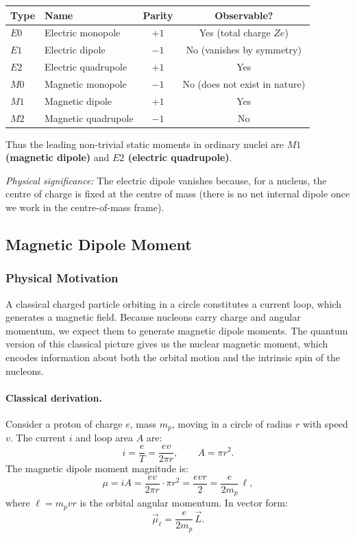 \begin{center}
\begin{tabular}{l l c c}
\toprule
Type & Name & Parity & Observable? \\
\midrule
$E0$ & Electric monopole & $+1$ & Yes (total charge $Ze$) \\
$E1$ & Electric dipole   & $-1$ & No (vanishes by symmetry) \\
$E2$ & Electric quadrupole & $+1$ & Yes \\
$M0$ & Magnetic monopole & $-1$ & No (does not exist in nature) \\
$M1$ & Magnetic dipole   & $+1$ & Yes \\
$M2$ & Magnetic quadrupole & $-1$ & No \\
\bottomrule
\end{tabular}
\end{center}

Thus the leading non-trivial static moments in ordinary nuclei are \textbf{$M1$ (magnetic dipole)} and \textbf{$E2$ (electric quadrupole)}.

\medskip
\textit{Physical significance:} The electric dipole vanishes because, for a nucleus, the centre of charge is fixed at the centre of mass (there is no net internal dipole once we work in the centre-of-mass frame).

\subsection*{Magnetic Dipole Moment}

\subsubsection*{Physical Motivation}
A classical charged particle orbiting in a circle constitutes a current loop, which generates a magnetic field.  Because nucleons carry charge and angular momentum, we expect them to generate magnetic dipole moments.  The quantum version of this classical picture gives us the nuclear magnetic moment, which encodes information about both the orbital motion and the intrinsic spin of the nucleons.

\paragraph{Classical derivation.}
Consider a proton of charge $e$, mass $m_p$, moving in a circle of radius $r$ with speed $v$.  The current $i$ and loop area $A$ are:
\[
  i = \frac{e}{T} = \frac{ev}{2\pi r}, \qquad A = \pi r^2.
\]
The magnetic dipole moment magnitude is:
\[
  \mu = iA = \frac{ev}{2\pi r}\cdot \pi r^2 = \frac{evr}{2} = \frac{e}{2m_p}\,\ell,
\]
where $\ell = m_p v r$ is the orbital angular momentum.  In vector form:
\begin{equation}
  \label{eq:classical_magnetic}
  \vec{\mu}_\ell = \frac{e}{2m_p}\,\vec{L}.
\end{equation}

